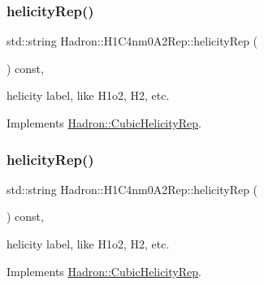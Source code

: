\mbox{\label{structHadron_1_1H1C4nm0A2Rep_a4f5f743a470752f526a30b7db1ba0f21}} 
\subsubsection{\texorpdfstring{helicityRep()}{helicityRep()}\hspace{0.1cm}{\footnotesize\ttfamily [1/2]}}
{\footnotesize\ttfamily std\+::string Hadron\+::\+H1\+C4nm0\+A2\+Rep\+::helicity\+Rep (\begin{DoxyParamCaption}{ }\end{DoxyParamCaption}) const\hspace{0.3cm}{\ttfamily [inline]}, {\ttfamily [virtual]}}

helicity label, like H1o2, H2, etc. 

Implements \mbox{\hyperlink{structHadron_1_1CubicHelicityRep_af1096946b7470edf0a55451cc662f231}{Hadron\+::\+Cubic\+Helicity\+Rep}}.

\mbox{\label{structHadron_1_1H1C4nm0A2Rep_a4f5f743a470752f526a30b7db1ba0f21}} 
\subsubsection{\texorpdfstring{helicityRep()}{helicityRep()}\hspace{0.1cm}{\footnotesize\ttfamily [2/2]}}
{\footnotesize\ttfamily std\+::string Hadron\+::\+H1\+C4nm0\+A2\+Rep\+::helicity\+Rep (\begin{DoxyParamCaption}{ }\end{DoxyParamCaption}) const\hspace{0.3cm}{\ttfamily [inline]}, {\ttfamily [virtual]}}

helicity label, like H1o2, H2, etc. 

Implements \mbox{\hyperlink{structHadron_1_1CubicHelicityRep_af1096946b7470edf0a55451cc662f231}{Hadron\+::\+Cubic\+Helicity\+Rep}}.

\mbox{\label{structHadron_1_1H1C4nm0A2Rep_aa814381161d711ca3fb036897c27ec86}} 
